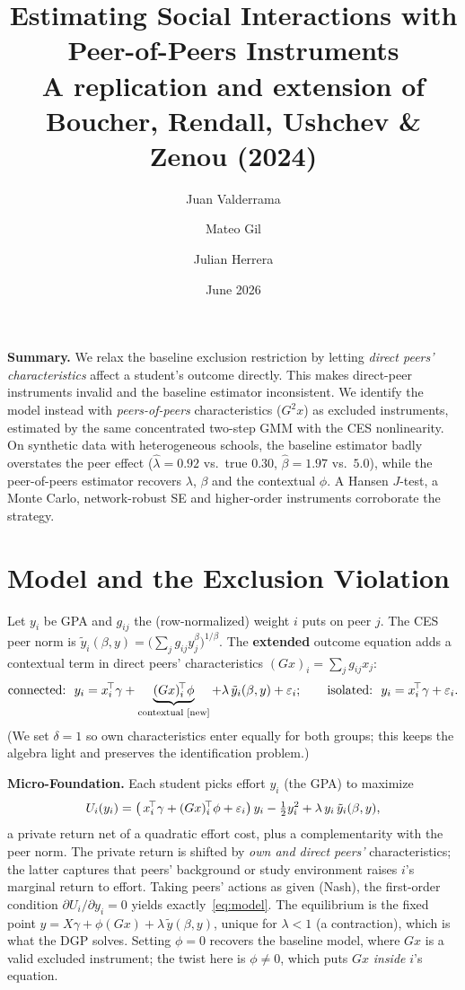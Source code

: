 \documentclass[11pt]{article}
\title{\vspace{-1.4cm}\sffamily\bfseries\color{ink} Estimating Social Interactions with Peer-of-Peers Instruments\\[2pt]
\large A replication and extension of Boucher, Rendall, Ushchev \& Zenou (2024)}
\author{Juan Valderrama \and Mateo Gil \and Julian Herrera}
\date{June 2026}
\renewcommand{\_}{\textunderscore\allowbreak}
\begin{document}
\maketitle
\vspace{-0.7cm}

\noindent\textbf{Summary.} We relax the baseline exclusion restriction by letting \emph{direct peers' characteristics} affect a student's outcome directly. This makes direct-peer instruments invalid and the baseline estimator inconsistent. We identify the model instead with \emph{peers-of-peers} characteristics ($G^2x$) as excluded instruments, estimated by the same concentrated two-step GMM with the CES nonlinearity. On synthetic data with heterogeneous schools, the baseline estimator badly overstates the peer effect ($\widehat\lambda=0.92$ vs.\ true $0.30$, $\widehat\beta=1.97$ vs.\ $5.0$), while the peer-of-peers estimator recovers $\lambda$, $\beta$ and the contextual $\phi$. A Hansen $J$-test, a Monte Carlo, network-robust SE and higher-order instruments corroborate the strategy.

\section{Model and the Exclusion Violation}
Let $y_i$ be GPA and $g_{ij}$ the (row-normalized) weight $i$ puts on peer $j$. The CES peer norm is $\tilde y_i(\beta,y)=\big(\sum_j g_{ij}y_j^{\beta}\big)^{1/\beta}$. The \textbf{extended} outcome equation adds a contextual term in direct peers' characteristics $(Gx)_i=\sum_j g_{ij}x_j$:
\begin{equation}\label{eq:model}
\text{connected:}\ \ y_i = x_i^{\!\top}\gamma + \underbrace{(Gx)_i^{\!\top}\phi}_{\text{contextual [new]}} + \lambda\,\tilde y_i(\beta,y) + \varepsilon_i;
\qquad \text{isolated:}\ \ y_i = x_i^{\!\top}\gamma + \varepsilon_i .
\end{equation}
(We set $\delta=1$ so own characteristics enter equally for both groups; this keeps the algebra light and preserves the identification problem.)

\textbf{Micro-Foundation.} Each student picks effort $y_i$ (the GPA) to maximize
\[ U_i(y_i)=\big(\,x_i^{\!\top}\gamma+(Gx)_i^{\!\top}\phi+\varepsilon_i\big)\,y_i-\tfrac12 y_i^2+\lambda\,y_i\,\tilde y_i(\beta,y), \]
a private return net of a quadratic effort cost, plus a complementarity with the peer norm. The private return is shifted by \emph{own and direct peers'} characteristics; the latter captures that peers' background or study environment raises $i$'s marginal return to effort. Taking peers' actions as given (Nash), the first-order condition $\partial U_i/\partial y_i=0$ yields exactly~\eqref{eq:model}. The equilibrium is the fixed point $y=X\gamma+\phi(Gx)+\lambda\,\tilde y(\beta,y)$, unique for $\lambda<1$ (a contraction), which is what the DGP solves. Setting $\phi=0$ recovers the baseline model, where $Gx$ is a valid excluded instrument; the twist here is $\phi\neq0$, which puts $Gx$ \emph{inside} $i$'s equation.
\end{document}
